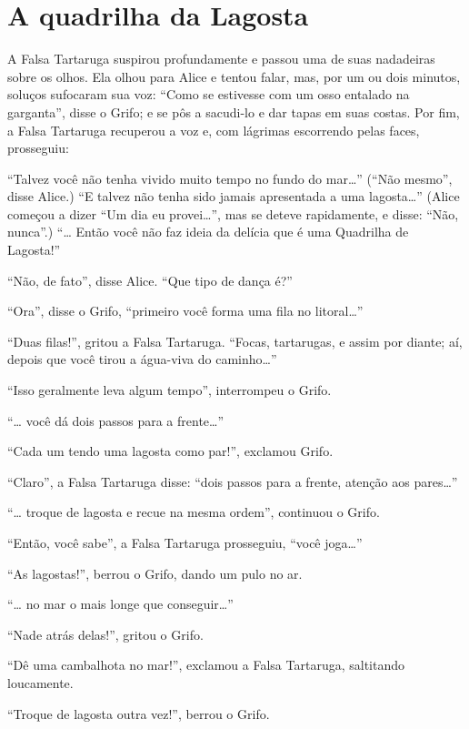 \quebra\chapter{A quadrilha da Lagosta}

A Falsa Tartaruga suspirou profundamente e passou uma de suas
nadadeiras sobre os olhos. Ela olhou para Alice e tentou falar, mas,
por um ou dois minutos, soluços sufocaram sua voz: ``Como se estivesse
com um osso entalado na garganta'', disse o Grifo; e se pôs a sacudi-lo
e dar tapas em suas costas. Por fim, a Falsa Tartaruga recuperou a voz
e, com lágrimas escorrendo pelas faces, prosseguiu:

``Talvez você não tenha vivido muito tempo no fundo do mar\ldots{}'' (``Não
mesmo'', disse Alice.) ``E talvez não tenha sido jamais apresentada a uma
lagosta\ldots{}'' (Alice começou a dizer ``Um dia eu provei\ldots{}'', mas se
deteve rapidamente, e disse: ``Não, nunca''.) ``\ldots{} Então você não faz
ideia da delícia que é uma Quadrilha de Lagosta!''

``Não, de fato'', disse Alice. ``Que tipo de dança é?''

``Ora'', disse o Grifo, ``primeiro você forma uma fila no litoral\ldots{}''

``Duas filas!'', gritou a Falsa Tartaruga. ``Focas, tartarugas, e assim
por diante; aí, depois que você tirou a água-viva do caminho\ldots{}''

``Isso geralmente leva algum tempo'', interrompeu o Grifo.

``\ldots{} você dá dois passos para a frente\ldots{}''

``Cada um tendo uma lagosta como par!'', exclamou Grifo.

``Claro'', a Falsa Tartaruga disse: ``dois passos para a frente, atenção
aos pares\ldots{}''

``\ldots{} troque de lagosta e recue na mesma ordem'', continuou o Grifo.

``Então, você sabe'', a Falsa Tartaruga prosseguiu, ``você joga\ldots{}''

``As lagostas!'', berrou o Grifo, dando um pulo no ar.

``\ldots{} no mar o mais longe que conseguir\ldots{}''

``Nade atrás delas!'', gritou o Grifo.

``Dê uma cambalhota no mar!'', exclamou a Falsa Tartaruga, saltitando
loucamente.

``Troque de lagosta outra vez!'', berrou o Grifo.

